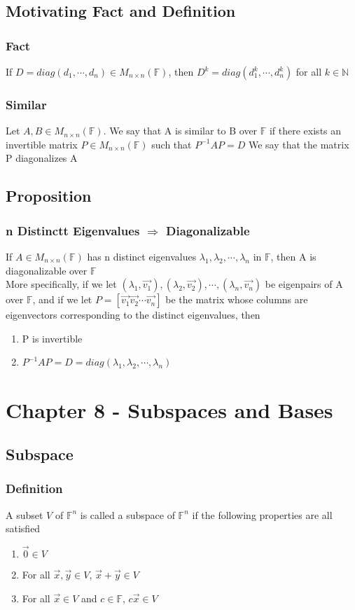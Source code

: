 \documentclass[12pt, letterpaper]{article}
\begin{document}
\subsection{Motivating Fact and Definition}
\subsubsection{Fact}
If $D = diag(d_1, \cdots, d_n)\in M_{n\times n}(\mathbb{F})$, then $D^k = diag(d_1^k, \cdots, d_n^k)$ for all $k\in\mathbb{N}$
\subsubsection{Similar}
Let $A, B\in M_{n\times n}(\mathbb{F})$. We say that A is similar to B over $\mathbb{F}$ if there exists an invertible matrix $P\in M_{n\times n}(\mathbb{F})$ such that $P^{-1}AP = D$
We say that the matrix P diagonalizes A 
\subsection{Proposition}
\subsubsection{n Distinctt Eigenvalues $\Rightarrow$ Diagonalizable}
If $A\in M_{n\times n}(\mathbb{F})$ has n distinct eigenvalues $\lambda_1, \lambda_2, \cdots, \lambda_n$ in $\mathbb{F}$, then 
A is diagonalizable over $\mathbb{F}$ \\
More specifically, if we let $(\lambda_1, \vec{v_1}), (\lambda_2, \vec{v_2}), \cdots, (\lambda_n, \vec{v_n})$ be 
eigenpairs of A over $\mathbb{F}$, and if we let $P = [\vec{v_1}\vec{v_2}\cdots\vec{v_n}]$ be the 
matrix whose columns are eigenvectors corresponding to the distinct eigenvalues, then 
\begin{enumerate}
    \item P is invertible 
    \item $P^{-1}AP = D = diag(\lambda_1, \lambda_2, \cdots, \lambda_n)$
\end{enumerate}

\section{Chapter 8 - Subspaces and Bases}
\subsection{Subspace}
\subsubsection{Definition}
A subset $V$ of $\mathbb{F}^n$ is called a subspace of $\mathbb{F}^n$ if the following properties are all satisfied 
\begin{enumerate}
    \item $\vec{0}\in V$
    \item For all $\vec{x},\vec{y}\in V$, $\vec{x}+\vec{y}\in V$
    \item For all $\vec{x}\in V$ and $c\in\mathbb{F}$, $c\vec{x}\in V$
\end{enumerate}
\end{document}
